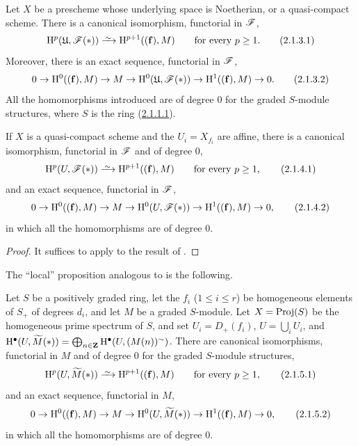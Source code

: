 \begin{proposition}[2.1.3]
\label{III.2.1.3}
Let $X$ be a prescheme whose underlying space is Noetherian, or a quasi-compact scheme.
There is a canonical isomorphism, functorial in $\mathscr{F}$,
\[
\label{III.2.1.3.1}
  \HH^p(\mathfrak{U},\sh{F}(*)) \simto \HH^{p+1}((\mathbf{f}),M)
  \qquad\text{for every } p\geq 1.
  \tag{2.1.3.1}
\]
Moreover, there is an exact sequence, functorial in $\mathscr{F}$,
\[
\label{III.2.1.3.2}
  0 \to \mathrm{H}^0((\mathbf{f}),M) \to M \to \mathrm{H}^0(\mathfrak{U},\mathscr{F}(*)) \to \mathrm{H}^1((\mathbf{f}),M) \to 0.
  \tag{2.1.3.2}
\]
All the homomorphisms introduced are of degree $0$ for the graded $S$-module structures, where $S$ is the ring \textup{(\hyperref[III.2.1.1.1]{2.1.1.1})}.
\end{proposition}

\begin{corollary}[2.1.4]
\label{III.2.1.4}
If $X$ is a quasi-compact scheme and the $U_i=X_{f_i}$ are affine, there is a canonical isomorphism, functorial in $\mathscr{F}$ and of degree $0$,
\[
\label{III.2.1.4.1}
  \HH^p(U,\sh{F}(*)) \simto \HH^{p+1}((\mathbf{f}),M)
  \qquad\text{for every } p\geq 1,
  \tag{2.1.4.1}
\]
and an exact sequence, functorial in $\mathscr{F}$,
\[
\label{III.2.1.4.2}
  0 \to \mathrm{H}^0((\mathbf{f}),M) \to M \to \mathrm{H}^0(U,\mathscr{F}(*)) \to \mathrm{H}^1((\mathbf{f}),M) \to 0,
  \tag{2.1.4.2}
\]
in which all the homomorphisms are of degree $0$.
\end{corollary}

\begin{proof}
It suffices to apply  to the result of .
\end{proof}

The ``local'' proposition analogous to  is the following.

\begin{proposition}[2.1.5]
\label{III.2.1.5}
Let $S$ be a positively graded ring, let the $f_i$ ($1\leq i\leq r$) be homogeneous elements of $S_+$ of degrees $d_i$, and let $M$ be a graded $S$-module.
Let $X=\operatorname{Proj}(S)$ be the homogeneous prime spectrum of $S$, and set $U_i=\mathit{D}_+(f_i)$, $U=\bigcup_i U_i$, and $\mathrm{H}^\bullet(U,\widetilde{M}(*))=\bigoplus_{n\in\mathbf{Z}}\mathrm{H}^\bullet(U,(M(n))^\sim)$.
There are canonical isomorphisms, functorial in $M$ and of degree $0$ for the graded $S$-module structures,
\[
\label{III.2.1.5.1}
  \HH^p(U,\widetilde{M}(*)) \simto \HH^{p+1}((\mathbf{f}),M)
  \qquad\text{for every } p\geq 1,
  \tag{2.1.5.1}
\]
and an exact sequence, functorial in $M$,
\[
\label{III.2.1.5.2}
  0 \to \mathrm{H}^0((\mathbf{f}),M) \to M \to \mathrm{H}^0(U,\widetilde{M}(*)) \to \mathrm{H}^1((\mathbf{f}),M) \to 0,
  \tag{2.1.5.2}
\]
in which all the homomorphisms are of degree $0$.
\end{proposition}

